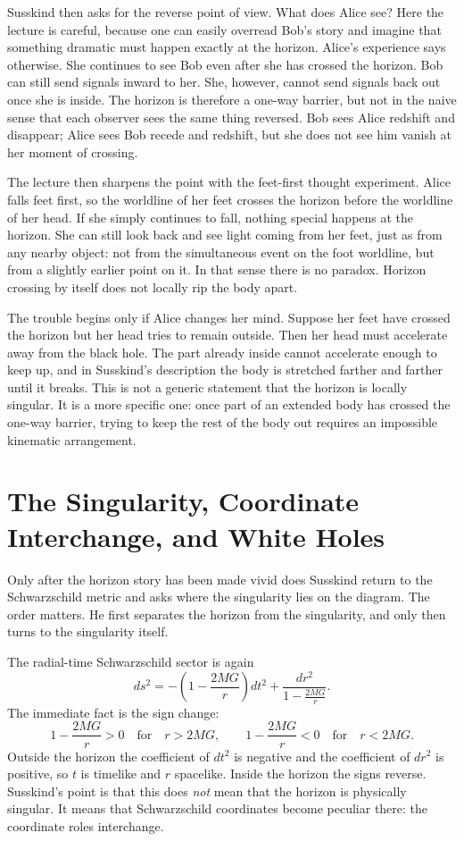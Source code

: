 Susskind then asks for the reverse point of view. What does Alice see? Here the lecture is careful, because one can easily overread Bob's story and imagine that something dramatic must happen exactly at the horizon. Alice's experience says otherwise. She continues to see Bob even after she has crossed the horizon. Bob can still send signals inward to her. She, however, cannot send signals back out once she is inside. The horizon is therefore a one-way barrier, but not in the naive sense that each observer sees the same thing reversed. Bob sees Alice redshift and disappear; Alice sees Bob recede and redshift, but she does not see him vanish at her moment of crossing.

The lecture then sharpens the point with the feet-first thought experiment. Alice falls feet first, so the worldline of her feet crosses the horizon before the worldline of her head. If she simply continues to fall, nothing special happens at the horizon. She can still look back and see light coming from her feet, just as from any nearby object: not from the simultaneous event on the foot worldline, but from a slightly earlier point on it. In that sense there is no paradox. Horizon crossing by itself does not locally rip the body apart.

The trouble begins only if Alice changes her mind. Suppose her feet have crossed the horizon but her head tries to remain outside. Then her head must accelerate away from the black hole. The part already inside cannot accelerate enough to keep up, and in Susskind's description the body is stretched farther and farther until it breaks. This is not a generic statement that the horizon is locally singular. It is a more specific one: once part of an extended body has crossed the one-way barrier, trying to keep the rest of the body out requires an impossible kinematic arrangement.

\section{The Singularity, Coordinate Interchange, and White Holes}

Only after the horizon story has been made vivid does Susskind return to the Schwarzschild metric and asks where the singularity lies on the diagram. The order matters. He first separates the horizon from the singularity, and only then turns to the singularity itself.

The radial-time Schwarzschild sector is again
\begin{equation}
ds^2=-\left(1-\frac{2MG}{r}\right)dt^2+\frac{dr^2}{1-\frac{2MG}{r}}.
\end{equation}
The immediate fact is the sign change:
\begin{equation}
1-\frac{2MG}{r}>0 \quad \text{for} \quad r>2MG,
\qquad
1-\frac{2MG}{r}<0 \quad \text{for} \quad r<2MG.
\end{equation}
Outside the horizon the coefficient of \(dt^2\) is negative and the coefficient of \(dr^2\) is positive, so \(t\) is timelike and \(r\) spacelike. Inside the horizon the signs reverse. Susskind's point is that this does \emph{not} mean that the horizon is physically singular. It means that Schwarzschild coordinates become peculiar there: the coordinate roles interchange.

